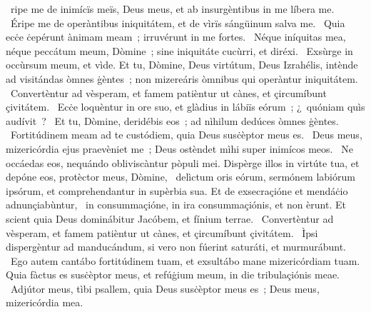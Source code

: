 \psalmChapterWithInscription{}
{ }
{%
~ripe me de inimícïs meïs, Deus meus, et ab insurgèntibus in me líbera me. 
~Éripe me de operàntibus iniquitátem, et de vìrïs sángüinum salva me. 
~Quia ecċe ċepérunt ànimam meam~; irruvérunt in me fortes. 
~Néque iníquitas mea, néque peccátum meum, Dòmine~; sine iniquitáte cucùrri, et diréxi. 
~Exsùrge in occùrsum meum, et vìde. Et tu, Dòmine, Deus virtútum, Deus Izrahélis, intènde ad visitándas òmnes ġèntes~; non mizereáris òmnibus qui operàntur iniquitátem. 
~Convertèntur ad vèsperam, et famem patièntur ut cànes, et çircumíbunt çivitátem. 
~Ecċe loquèntur in ore suo, et glàdius in lábiïs eórum~; ¿~quóniam quìs audívit~? 
~Et tu, Dòmine, deridébis eos~; ad nìhilum dedúces òmnes ġèntes. 
~Fortitúdinem meam ad te custódiem, quia Deus susċèptor meus es. 
~Deus meus, mizericórdia ejus praevèniet me~; Deus ostèndet mìhi super inimícos meos. 
~Ne occáedas eos, nequándo obliviscàntur pòpuli mei. Dispèrge illos in virtúte tua, et depóne eos, protèctor meus, Dòmine, 
~delìctum oris eórum, sermónem labiórum ipsórum, et comprehendantur in supèrbia sua. Et de exsecraçióne et mendáċio adnunçiabùntur, 
~in consummaçióne, in ira consummaçiónis, et non èrunt. Et scient quia Deus dominábitur Jacóbem, et fínium terrae. 
~Convertèntur ad vèsperam, et famem patièntur ut cànes, et çircumíbunt çivitátem. 
~Ìpsi dispergèntur ad manducándum, si vero non fúerint saturáti, et murmurábunt. 
~Ego autem cantábo fortitúdinem tuam, et exsultábo mane mizericórdiam tuam. Quia fàctus es susċèptor meus, et refúġium meum, in die tribulaçiónis meae. 
~Adjútor meus, tìbi psallem, quia Deus susċèptor meus es~; Deus meus, mizericórdia mea. 
}
